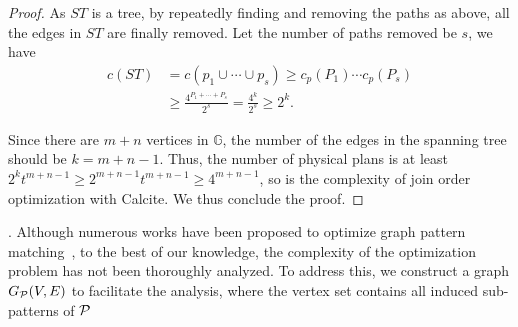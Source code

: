 \begin{proof}
    As $ST$ is a tree, by repeatedly finding and removing the paths as above, all the edges in $ST$ are finally removed.
    Let the number of paths removed be $s$, we have
    \begin{equation*}
        \begin{split}
            c(ST) & = c(p_1 \cup \cdots \cup p_s) \geq c_p(P_1) \cdots c_p(P_s) \\
            & \geq \frac{4^{P_1 + \cdots + P_s}}{2^s} = \frac{4^{k}}{2^s} \geq 2^{k}.
        \end{split}
    \end{equation*}


    Since there are $m + n$ vertices in $\mathbb{G}$, the number of the edges in the spanning tree should be $k = m + n - 1$.
    Thus, the number of physical plans is at least $2^{k}t^{m+n-1} \geq 2^{m+n-1}t^{m+n-1} \geq 4^{m+n-1}$, so is the complexity of join order optimization with Calcite.
    We thus conclude the proof.
\end{proof}


. Although numerous works have been proposed to optimize graph pattern matching~\cite{huge,GLogS,mhedhbi2019optimizing}, to the best of our knowledge, the complexity of the optimization problem has not been thoroughly analyzed. To address this, we construct a graph $G_{\mathcal{P}}(V, E)$ to facilitate the analysis, where the vertex set contains all induced sub-patterns of $\mathcal{P}$ 

